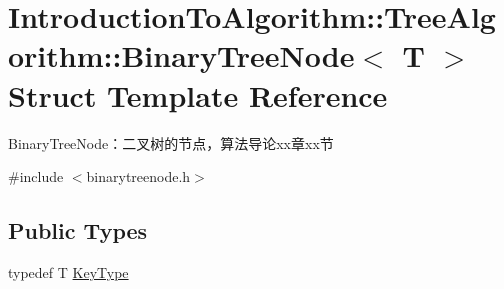 \hypertarget{struct_introduction_to_algorithm_1_1_tree_algorithm_1_1_binary_tree_node}{}\section{Introduction\+To\+Algorithm\+:\+:Tree\+Algorithm\+:\+:Binary\+Tree\+Node$<$ T $>$ Struct Template Reference}
\label{struct_introduction_to_algorithm_1_1_tree_algorithm_1_1_binary_tree_node}


Binary\+Tree\+Node：二叉树的节点，算法导论xx章xx节  




{\ttfamily \#include $<$binarytreenode.\+h$>$}

\subsection*{Public Types}
\begin{DoxyCompactItemize}
\item 
typedef T \hyperlink{struct_introduction_to_algorithm_1_1_tree_algorithm_1_1_binary_tree_node_a0274d2f034151ffda56a3f466b73f762}{Key\+Type}
\end{DoxyCompactItemize}
